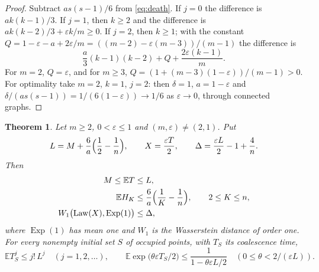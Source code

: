 \documentclass[11pt,a4paper]{article}
\numberwithin{equation}{section}
\newtheorem{theorem}{Theorem}[section]
\theoremstyle{remark}
\newcommand{\E}{\mathbb E}
\newcommand{\eps}{\varepsilon}
\newcommand{\Exp}{\operatorname{Exp}}
\begin{document}
\begin{proof}
Subtract $as(s-1)/6$ from \eqref{eq:death}. If $j=0$ the difference is $ak(k-1)/3$. If $j=1$, then $k\ge2$ and the difference is $ak(k-2)/3+\eps k/m\ge0$. If $j=2$, then $k\ge1$; with the constant $Q=1-\eps-a+2\eps/m=((m-2)-\eps(m-3))/(m-1)$ the difference is
\[
\frac a3(k-1)(k-2)+Q+\frac{2\eps(k-1)}m.
\]
For $m=2$, $Q=\eps$, and for $m\ge3$, $Q=(1+(m-3)(1-\eps))/(m-1)>0$. For optimality take $m=2$, $k=1$, $j=2$: then $\delta=1$, $a=1-\eps$ and $\delta/(as(s-1))=1/(6(1-\eps))\to1/6$ as $\eps\to0$, through connected graphs.
\end{proof}

\begin{theorem}\label{thm:finite}
Let $m\ge2$, $0<\eps\le1$ and $(m,\eps)\ne(2,1)$. Put
\[
L=M+\frac6a\Bigl(\frac12-\frac1n\Bigr),\qquad X=\frac{\eps T}2,\qquad \Delta=\frac{\eps L}2-1+\frac4n .
\]
Then
\begin{align}
M\le\E T&\le L,\label{eq:sandwich}\\
\E H_K&\le\frac6a\Bigl(\frac1K-\frac1n\Bigr),\qquad 2\le K\le n,\label{eq:HK}\\
W_1\bigl(\mathrm{Law}(X),\Exp(1)\bigr)&\le\Delta,\label{eq:W1}
\end{align}
where $\Exp(1)$ has mean one and $W_1$ is the Wasserstein distance of order one. For every nonempty initial set $S$ of occupied points, with $T_S$ its coalescence time,
\begin{equation}\label{eq:moments}
\E T_S^j\le j!\,L^j\quad(j=1,2,\dots),\qquad \E\exp\bigl(\theta\eps T_S/2\bigr)\le\frac1{1-\theta\eps L/2}\quad(0\le\theta<2/(\eps L)).
\end{equation}
\end{theorem}
\end{document}
